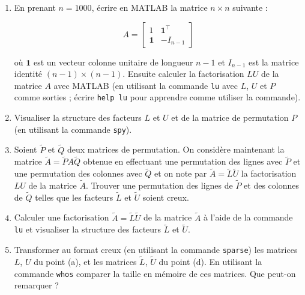 \begin{enumerate}[label=\alph*)]
  \item En prenant $n = 1000$, écrire en \textsc{MATLAB} la matrice $n \times n$ suivante :
  
        \begin{equation*}
          A = \begin{bmatrix}
                1 & \textbf{1}^{\top}   \\
                \textbf{1} & -I_{n - 1}
              \end{bmatrix}
        \end{equation*}

        où $\textbf{1}$ est un vecteur colonne unitaire de longueur $n - 1$ et $I_{n-1}$ est la matrice identité $(n - 1) \times (n - 1)$.
        Ensuite calculer la factorisation $LU$ de la matrice $A$ avec \textsc{MATLAB} (en utilisant la commande \texttt{lu} avec $L$, $U$ et $P$ comme sorties ; écrire \texttt{help lu} pour apprendre comme utiliser la commande).

  \item Visualiser la structure des facteurs $L$ et $U$ et de la matrice de permutation $P$ (en utilisant la commande \texttt{spy}).
  
  \item Soient $\tilde{P}$ et $\tilde{Q}$ deux matrices de permutation.
        On considère maintenant la matrice $\tilde{A} = \tilde{P} A \tilde{Q}$ obtenue en effectuant une permutation des lignes avec $\tilde{P}$ et une permutation des colonnes avec $\tilde{Q}$ et on note par $\tilde{A} = \tilde{L} \tilde{U}$ la factorisation $LU$ de la matrice $\tilde{A}$.
        Trouver une permutation des lignes de $\tilde{P}$ et des colonnes de $\tilde{Q}$ telles que les facteurs $\tilde{L}$ et $\tilde{U}$ soient creux.

  \item Calculer une factorisation $\tilde{A} = \tilde{L} \tilde{U}$ de la matrice $\tilde{A}$ à l'aide de la commande \texttt{lu} et visualiser la structure des facteurs $\tilde{L}$ et $\tilde{U}$.
  
  \item Transformer au format creux (en utilisant la commande \texttt{sparse}) les matrices $L$, $U$ du point (a), et les matrices $\tilde{L}$, $\tilde{U}$ du point (d).
        En utilisant la commande \texttt{whos} comparer la taille en mémoire de ces matrices.
        Que peut-on remarquer ?
\end{enumerate}